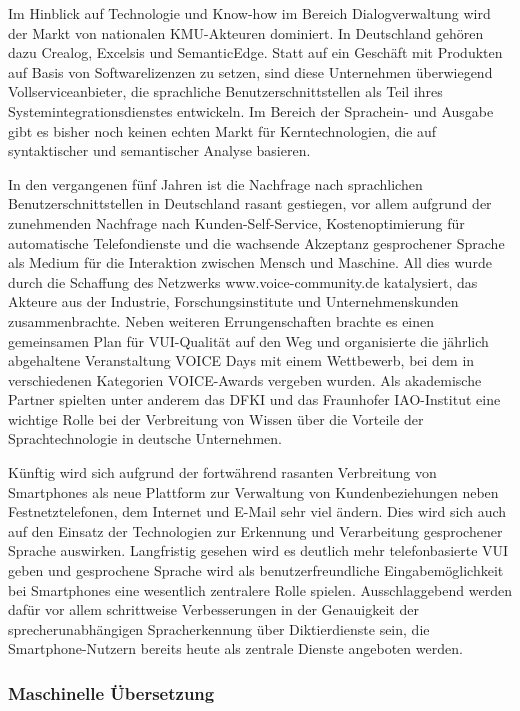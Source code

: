 \documentclass[]{../../metanetpaper}
\begin{document}
\begin{multicols}{2}
Im Hinblick auf Technologie und Know-how im Bereich Dialogverwaltung wird der Markt von nationalen KMU-Akteuren dominiert. In Deutschland gehören dazu Crealog, Excelsis und SemanticEdge. Statt auf ein Geschäft mit Produkten auf Basis von Softwarelizenzen zu setzen, sind diese Unternehmen überwiegend Vollserviceanbieter, die sprachliche Benutzerschnittstellen als Teil ihres Systemintegrationsdienstes entwickeln. Im Bereich der Sprachein- und Ausgabe gibt es bisher noch keinen echten Markt für Kerntechnologien, die auf syntaktischer und semantischer Analyse basieren.

In den vergangenen fünf Jahren ist die Nachfrage nach sprachlichen Benutzerschnittstellen in Deutschland rasant gestiegen, vor allem aufgrund der zunehmenden Nachfrage nach Kunden-Self-Service, Kostenoptimierung für automatische Telefondienste und die wachsende Akzeptanz gesprochener Sprache als Medium für die Interaktion zwischen Mensch und Maschine. All dies wurde durch die Schaffung des Netzwerks www.voice-community.de katalysiert, das Akteure aus der Industrie, Forschungsinstitute und Unternehmenskunden zusammenbrachte. Neben weiteren Errungenschaften brachte es einen gemeinsamen Plan für VUI-Qualität auf den Weg und organisierte die jährlich abgehaltene Veranstaltung VOICE Days mit einem Wettbewerb, bei dem in verschiedenen Kategorien VOICE-Awards vergeben wurden. Als akademische Partner spielten unter anderem das DFKI und das Fraunhofer IAO-Institut eine wichtige Rolle bei der Verbreitung von Wissen über die Vorteile der Sprachtechnologie in deutsche Unternehmen.

Künftig wird sich aufgrund der fortwährend rasanten Verbreitung von Smartphones als neue Plattform zur Verwaltung von Kundenbeziehungen neben Festnetztelefonen, dem Internet und E-Mail sehr viel ändern. Dies wird sich auch auf den Einsatz der Technologien zur Erkennung und Verarbeitung gesprochener Sprache auswirken. Langfristig gesehen wird es deutlich mehr telefonbasierte VUI geben und gesprochene Sprache wird als benutzerfreundliche Eingabemöglichkeit bei Smartphones eine wesentlich zentralere Rolle spielen. Ausschlaggebend werden dafür vor allem schrittweise Verbesserungen in der Genauigkeit der sprecherunabhängigen Spracherkennung über Diktierdienste sein, die Smartphone-Nutzern bereits heute als zentrale Dienste angeboten werden.

\subsubsection{Maschinelle Übersetzung}


\end{multicols}
\end{document}
